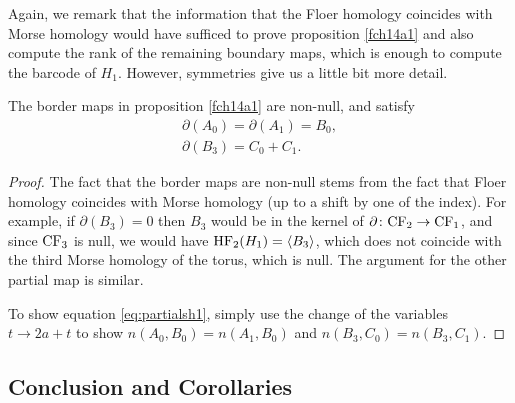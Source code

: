Again, we remark that the information that the Floer homology coincides with Morse homology would have sufficed to prove proposition \ref{fch14a1} and also compute the rank of the remaining boundary maps, which is enough to compute the barcode of $H_1$. However, symmetries give us a little bit more detail.

\begin{prop}\label{fch14a2}
The border maps in proposition \ref{fch14a1} are non-null, and satisfy
\begin{equation}\label{eq:partialsh1}
\begin{gathered}
\partial(A_0) = \partial(A_1) = B_0,\\
\partial(B_3) = C_0 + C_1.
\end{gathered}
\end{equation}
\end{prop}

\begin{proof}
The fact that the border maps are non-null stems from the fact that Floer homology coincides with Morse homology (up to a shift by one of the index). For example, if $\partial(B_3) = 0$ then $B_3$ would be in the kernel of $\partial \colon \mathrm{CF}_2 \to \mathrm{CF}_1$, and since $\mathrm{CF}_3$ is null, we would have $\mathrm{HF}_2(H_1) = \langle B_3\rangle$, which does not coincide with the third Morse homology of the torus, which is null. The argument for the other partial map is similar.

To show equation \eqref{eq:partialsh1}, simply use the change of the variables $t \to 2a + t$ to show $n(A_0,B_0) = n(A_1,B_0)$ and $n(B_3,C_0) = n(B_3,C_1)$.
\end{proof}

\subsection{Conclusion and Corollaries}

